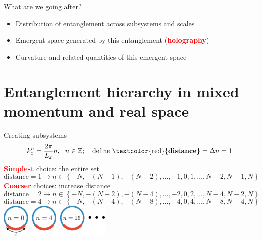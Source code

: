 \documentclass[11pt,aspectratio=169]{beamer}
\newcommand{\focus}[1]{\textcolor{red}{\bf{#1}}}
\begin{document}
\begin{frame}{What are we going after?}
	\begin{itemize}
		\item Distribution of entanglement across subsystems and scales\\[20pt]
		\item Emergent space generated by this entanglement (\focus{holography})\\[20pt]
		\item Curvature and related quantities of this emergent space
	\end{itemize}

\end{frame}

\section{Entanglement hierarchy in mixed momentum and real space}

\begin{frame}{Creating subsystems}
	\[k_x^n = \frac{2\pi }{L_x} n,~ ~ n \in \mathbb{Z};~~~ \text{define \focus{distance}} = \Delta n = 1\]
	\focus{Simplest} choice: the entire set
	\[\text{distance} = 1 \longrightarrow n \in \left\{-N,-(N-1),-(N-2),\ldots,-1,0,1,\ldots,N-2,N-1,N\right\} \]
	\focus{Coarser} choices: increase distance
	\[\text{distance} = 2 \longrightarrow n \in \left\{-N,-(N-2),-(N-4),\ldots,-2,0,2,\ldots,N-4,N-2,N\right\} \]
	\[\text{distance} = 4 \longrightarrow n \in \left\{-N,-(N-4),-(N-8),\ldots,-4,0,4,\ldots,N-8,N-4,N\right\} \]
	\centering
	\vspace*{\fill}
	\includegraphics[width=0.4\textwidth]{figures/A_mi.pdf}
\end{frame}
\end{document}
